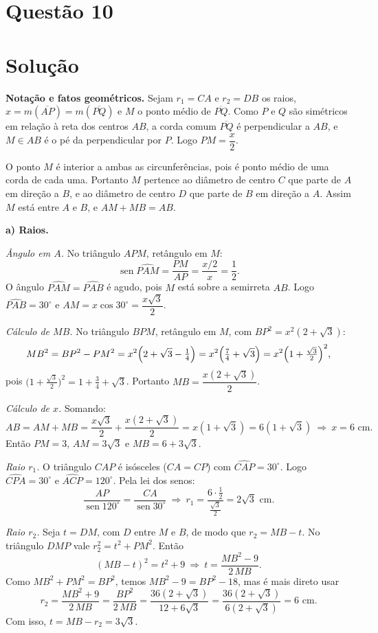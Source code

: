 \documentclass{article}%
\begin{document}
\section*{Questão 10}

\section*{Solução}

\textbf{Notação e fatos geométricos.} Sejam $r_1=CA$ e $r_2=DB$ os raios, $x=m(\overline{AP})=m(\overline{PQ})$ e $M$ o ponto médio de $\overline{PQ}$. Como $P$ e $Q$ são simétricos em relação à reta dos centros $AB$, a corda comum $\overline{PQ}$ é perpendicular a $AB$, e $M\in AB$ é o pé da perpendicular por $P$. Logo $PM=\dfrac{x}{2}$.

O ponto $M$ é interior a ambas as circunferências, pois é ponto médio de uma corda de cada uma. Portanto $M$ pertence ao diâmetro de centro $C$ que parte de $A$ em direção a $B$, e ao diâmetro de centro $D$ que parte de $B$ em direção a $A$. Assim $M$ está entre $A$ e $B$, e $AM+MB=AB$.

\medskip
\textbf{a) Raios.}

\emph{Ângulo em $A$.} No triângulo $APM$, retângulo em $M$:
\[
\operatorname{sen}\widehat{PAM}=\frac{PM}{AP}=\frac{x/2}{x}=\frac12 .
\]
O ângulo $\widehat{PAM}=\widehat{PAB}$ é agudo, pois $M$ está sobre a semirreta $AB$. Logo $\widehat{PAB}=30^\circ$ e $AM=x\cos30^\circ=\dfrac{x\sqrt3}{2}$.

\emph{Cálculo de $MB$.} No triângulo $BPM$, retângulo em $M$, com $BP^2=x^2(2+\sqrt3)$:
\[
MB^2=BP^2-PM^2=x^2\Bigl(2+\sqrt3-\tfrac14\Bigr)=x^2\Bigl(\tfrac74+\sqrt3\Bigr)=x^2\Bigl(1+\tfrac{\sqrt3}{2}\Bigr)^2 ,
\]
pois $\bigl(1+\tfrac{\sqrt3}{2}\bigr)^2=1+\tfrac34+\sqrt3$. Portanto $MB=\dfrac{x(2+\sqrt3)}{2}$.

\emph{Cálculo de $x$.} Somando:
\[
AB=AM+MB=\frac{x\sqrt3}{2}+\frac{x(2+\sqrt3)}{2}=x(1+\sqrt3)=6(1+\sqrt3)\ \Rightarrow\ x=6\text{ cm}.
\]
Então $PM=3$, $AM=3\sqrt3$ e $MB=6+3\sqrt3$.

\emph{Raio $r_1$.} O triângulo $CAP$ é isósceles ($CA=CP$) com $\widehat{CAP}=30^\circ$. Logo $\widehat{CPA}=30^\circ$ e $\widehat{ACP}=120^\circ$. Pela lei dos senos:
\[
\frac{AP}{\operatorname{sen}120^\circ}=\frac{CA}{\operatorname{sen}30^\circ}\ \Rightarrow\ r_1=\frac{6\cdot\frac12}{\frac{\sqrt3}{2}}=2\sqrt3\text{ cm}.
\]

\emph{Raio $r_2$.} Seja $t=DM$, com $D$ entre $M$ e $B$, de modo que $r_2=MB-t$. No triângulo $DMP$ vale $r_2^2=t^2+PM^2$. Então
\[
(MB-t)^2=t^2+9\ \Rightarrow\ t=\frac{MB^2-9}{2\,MB}.
\]
Como $MB^2+PM^2=BP^2$, temos $MB^2-9=BP^2-18$, mas é mais direto usar
\[
r_2=\frac{MB^2+9}{2\,MB}=\frac{BP^2}{2\,MB}=\frac{36(2+\sqrt3)}{12+6\sqrt3}=\frac{36(2+\sqrt3)}{6(2+\sqrt3)}=6\text{ cm}.
\]
Com isso, $t=MB-r_2=3\sqrt3$.
\end{document}
